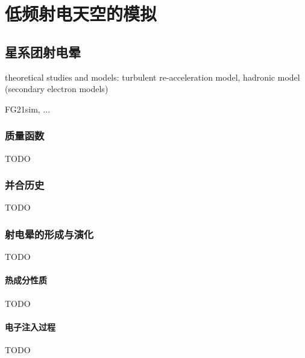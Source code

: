
\chapter{低频射电天空的模拟}
\label{chap:simulation}

\section{星系团射电晕}
\label{sec:radio-halos}

theoretical studies and models:
turbulent re-acceleration model,
hadronic model (secondary electron models)

FG21sim, ...

\subsection{质量函数}

TODO

\subsection{并合历史}

TODO

\subsection{射电晕的形成与演化}

TODO

\subsubsection{热成分性质}

TODO

\subsubsection{电子注入过程}

TODO

